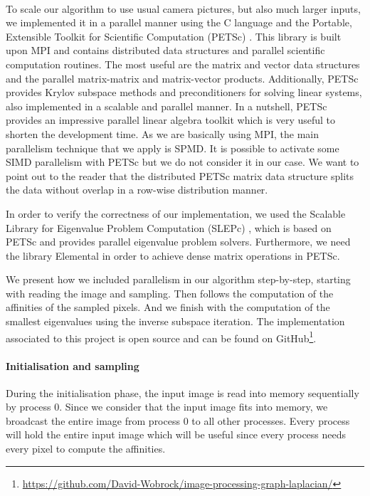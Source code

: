 \paragraph{}
To scale our algorithm to use usual camera pictures, but also much larger inputs, we implemented it in a parallel manner using the C language and the Portable, Extensible Toolkit for Scientific Computation (PETSc) \cite{petsc_web_page}.
This library is built upon MPI and contains distributed data structures and parallel scientific computation routines.
The most useful are the matrix and vector data structures and the parallel matrix-matrix and matrix-vector products.
Additionally, PETSc provides Krylov subspace methods and preconditioners for solving linear systems, also implemented in a scalable and parallel manner.
In a nutshell, PETSc provides an impressive parallel linear algebra toolkit which is very useful to shorten the development time.
As we are basically using MPI, the main parallelism technique that we apply is SPMD.
It is possible to activate some SIMD parallelism with PETSc but we do not consider it in our case.
We want to point out to the reader that the distributed PETSc matrix data structure splits the data without overlap in a row-wise distribution manner.

In order to verify the correctness of our implementation, we used the Scalable Library for Eigenvalue Problem Computation (SLEPc) \cite{hernandez_slepc_2005}, which is based on PETSc and provides parallel eigenvalue problem solvers.
Furthermore, we need the library Elemental \cite{poulson_elemental_2013} in order to achieve dense matrix operations in PETSc.

We present how we included parallelism in our algorithm step-by-step, starting with reading the image and sampling.
Then follows the computation of the affinities of the sampled pixels.
And we finish with the computation of the smallest eigenvalues using the inverse subspace iteration.
The implementation associated to this project is open source and can be found on GitHub\footnote{\url{https://github.com/David-Wobrock/image-processing-graph-laplacian/}}.

\paragraph{Initialisation and sampling}
During the initialisation phase, the input image is read into memory sequentially by process 0.
Since we consider that the input image fits into memory, we broadcast the entire image from process 0 to all other processes.
Every process will hold the entire input image which will be useful since every process needs every pixel to compute the affinities.

